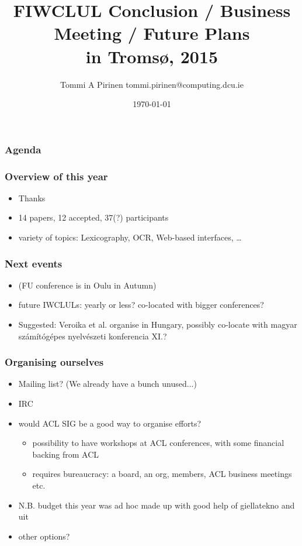 \documentclass{beamer}
\title{FIWCLUL Conclusion / Business Meeting / Future Plans\\
\scriptsize{in Tromsø, 2015}}
\author{Tommi A Pirinen \scriptsize \guilsinglleft tommi.pirinen@computing.dcu.ie \guilsinglright }
\institute{DCU, CNGL}
\date{\today}
\makeatletter
\newcommand\listofframes{\@starttoc{lbf}}
\makeatother
\begin{document}

\maketitle

\begin{frame}
    \frametitle{Agenda}
    \listofframes
\end{frame}

\begin{frame}
    \frametitle{Overview of this year}
    \begin{itemize}
        \item Thanks
        \item 14 papers, 12 accepted, 37(?) participants
        \item variety of topics: Lexicography, OCR, Web-based interfaces,
            \ldots
    \end{itemize}
\end{frame}

\begin{frame}
    \frametitle{Next events}
    \begin{itemize}
        \item (FU conference is in Oulu in Autumn)
        \item future IWCLULs: yearly or less? co-located with bigger
            conferences?
        \item Suggested: Veroika et al. organise in Hungary, possibly
            co-locate with magyar számítógépes nyelvészeti konferencia XI.?
    \end{itemize}
\end{frame}

\begin{frame}
    \frametitle{Organising ourselves}
    \begin{itemize}
        \item Mailing list? (We already have a bunch unused...)
        \item IRC
        \item would ACL SIG be a good way to organise efforts?
            \begin{itemize}
                \item possibility to have workshops at ACL conferences,
                    with some financial backing from ACL
                \item requires bureaucracy: a board, an org, members,
                    ACL business meetings etc.
            \end{itemize}
        \item N.B. budget this year was ad hoc made up with good help
            of giellatekno and uit
        \item other options?
    \end{itemize}
\end{frame}
\end{document}
